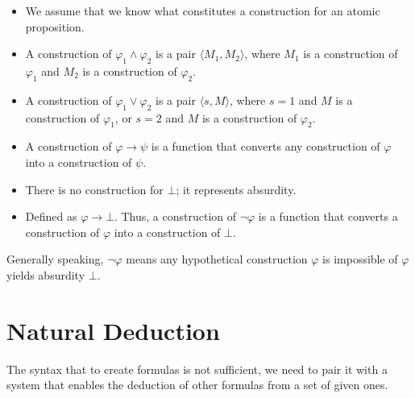 \begin{itemize}
  \item We assume that we know what constitutes a construction for an atomic proposition.

  \item A construction of
  $\varphi_1 \wedge \varphi_2$ is a pair $\langle M_1, M_2\rangle$, where
  $M_1$ is a construction of $\varphi_1$ and $M_2$ is a construction of
  $\varphi_2$.

  \item A construction of
  $\varphi_1 \vee \varphi_2$ is a pair $\langle s, M\rangle$, where $s = 1$
  and $M$ is a construction of $\varphi_1$, or $s = 2$ and $M$ is a
  construction of $\varphi_2$.

  \item A construction of
  $\varphi \to \psi$ is a function that converts any construction of
  $\varphi$ into a construction of $\psi$.

  \item There is no construction for $\bot$; it
  represents absurdity.

  \item Defined as $\varphi \to \bot$.
  Thus, a construction of $\neg\varphi$ is a function that converts a construction of $\varphi$ into a construction of $\bot$.
\end{itemize}

\begin{remark}
  Generally speaking, $\neg\varphi$
  means any hypothetical construction $\varphi$ is impossible of $\varphi$ yields absurdity $\bot$.
  
\end{remark}

\section{\centering Natural Deduction}

The syntax that to create formulas is not sufficient, we need to pair it with a system that enables the deduction of other formulas from a set of given ones.

\newcommand{\Fm}{\mathcal{F}}
\newcommand{\Rules}{\mathcal{R}}
\newcommand{\Axioms}{\mathcal{A}}
\newcommand{\Cn}{\mathrm{Cn}}

